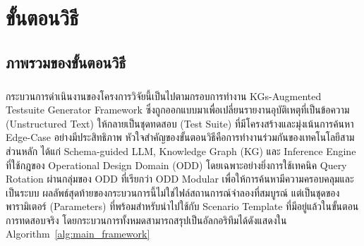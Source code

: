 \chapter{ขั้นตอนวิธี}\label{ch:methodology}

\section{ภาพรวมของขั้นตอนวิธี}\label{sec:ch4_methodology_overview}
\paragraph{}
กระบวนการดำเนินงานของโครงการวิจัยนี้เป็นไปตามกรอบการทำงาน KGs-Augmented Testsuite Generator Framework ซึ่งถูกออกแบบมาเพื่อเปลี่ยนรายงานอุบัติเหตุที่เป็นข้อความ (Unstructured Text) ให้กลายเป็นชุดทดสอบ (Test Suite) ที่มีโครงสร้างและมุ่งเน้นการค้นหา Edge-Case อย่างมีประสิทธิภาพ หัวใจสำคัญของขั้นตอนวิธีคือการทำงานร่วมกันของเทคโนโลยีสามส่วนหลัก ได้แก่ Schema-guided LLM, Knowledge Graph (KG) และ Inference Engine ที่ใช้กฎของ Operational Design Domain (ODD) โดยเฉพาะอย่างยิ่งการใช้เทคนิค Query Rotation ผ่านกลุ่มของ ODD ที่เรียกว่า ODD Modular เพื่อให้การค้นหามีความครอบคลุมและเป็นระบบ ผลลัพธ์สุดท้ายของกระบวนการนี้ไม่ใช่ไฟล์สถานการณ์จำลองที่สมบูรณ์ แต่เป็นชุดของ พารามิเตอร์ (Parameters) ที่พร้อมสำหรับนำไปใช้กับ Scenario Template ที่มีอยู่แล้วในขั้นตอนการทดสอบจริง โดยกระบวนการทั้งหมดสามารถสรุปเป็นอัลกอริทึมได้ดังแสดงใน Algorithm~\ref{alg:main_framework}

